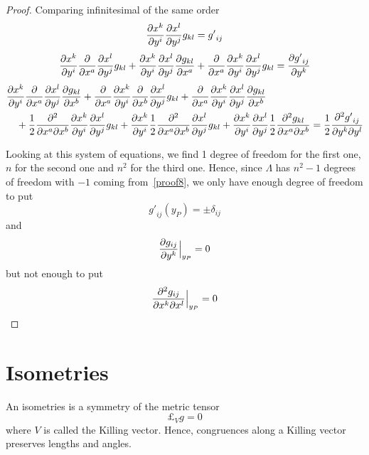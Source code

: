 \begin{proof}
        Comparing infinitesimal of the same order
        \begin{equation*}
            \frac{\partial x^k}{\partial y^i} \frac{\partial x^l}{\partial y^j} g_{kl} = {g'}_{ij}
        \end{equation*}
        \begin{equation*}
            \frac{\partial x^k}{\partial y^i} \frac{\partial}{\partial x^a} \frac{\partial x^l}{\partial y^j} g_{kl} + \frac{\partial x^k}{\partial y^i} \frac{\partial x^l}{\partial y^j} \frac{\partial g_{kl}}{\partial x^a} + \frac{\partial}{\partial x^a} \frac{\partial x^k}{\partial y^i} \frac{\partial x^l}{\partial y^j} g_{kl} = \frac{\partial{g'}_{ij}}{\partial y^k}
        \end{equation*}
        \begin{equation*}
        \begin{aligned}
            & \frac{\partial x^k}{\partial y^i} \frac{\partial}{\partial x^a} \frac{\partial x^l}{\partial y^j} \frac{\partial g_{kl}}{\partial x^b}
            + \frac{\partial}{\partial x^a} \frac{\partial x^k}{\partial y^i}\frac{\partial}{\partial x^b} \frac{\partial x^l}{\partial y^j} g_{kl}
            + \frac{\partial}{\partial x^a} \frac{\partial x^k}{\partial y^i} \frac{\partial x^l}{\partial y^j} \frac{\partial g_{kl}}{\partial x^b} \\ & \quad + \frac{1}{2} \frac{\partial^2 }{\partial x^a \partial x^b} \frac{\partial x^k}{\partial y^i} \frac{\partial x^l}{\partial y^j} g_{kl} 
            + \frac{\partial x^k}{\partial y^i} \frac{1}{2} \frac{\partial^2 }{\partial x^a \partial x^b} \frac{\partial x^l}{\partial y^j} g_{kl}
            + \frac{\partial x^k}{\partial y^i} \frac{\partial x^l}{\partial y^j} \frac{1}{2} \frac{\partial^2 g_{kl}}{\partial x^a \partial x^b} = \frac{1}{2} \frac{\partial^2 {g'}_{ij}}{\partial y^k \partial y^l}
        \end{aligned}
        \end{equation*}

        Looking at this system of equations, we find 1 degree of freedom for the first one, $n$ for the second one and $n^2$ for the third one. Hence, since $\Lambda$ has $n^2 - 1$ degrees of freedom with $-1$ coming from~\eqref{proof8}, we only have enough degree of freedom to put 
        \begin{equation*}
            {g'}_{ij} (y_P) = \pm \delta_{ij}
        \end{equation*}
        and 
        \begin{equation*}
            \frac{\partial g_{ij}}{\partial y^k} \Big\vert_{y_P} = 0
        \end{equation*}
        but not enough to put 
        \begin{equation*}
            \frac{\partial^2 g_{ij}}{\partial x^k \partial x^l} \Big\vert_{y_P} = 0
        \end{equation*}
    \end{proof}

\section{Isometries}

    An isometries is a symmetry of the metric tensor 
    \begin{equation*}
        \pounds_V g = 0
    \end{equation*}
    where $V$ is called the Killing vector. Hence, congruences along a Killing vector preserves lengths and angles.

